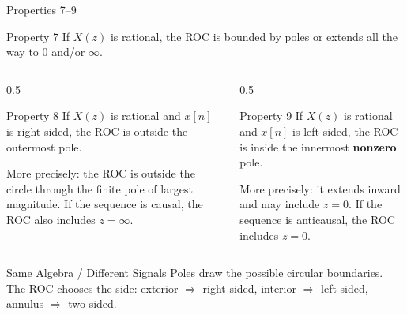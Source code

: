 \begin{frame}[t]{Properties 7--9}
  \footnotesize
  \begin{conceptbox}{Property 7}
    If $X(z)$ is rational, the ROC is bounded by poles or extends all the way to $0$ and/or $\infty$.
  \end{conceptbox}

  \begin{columns}[T]
    \begin{column}{0.5\textwidth}
      \begin{conceptbox}{Property 8}
        If $X(z)$ is rational and $x[n]$ is right-sided, the ROC is outside the outermost pole.
      \end{conceptbox}
      More precisely: the ROC is outside the circle through the finite pole of largest magnitude.
      If the sequence is causal, the ROC also includes $z=\infty$.
    \end{column}
    \begin{column}{0.5\textwidth}
      \begin{conceptbox}{Property 9}
        If $X(z)$ is rational and $x[n]$ is left-sided, the ROC is inside the innermost \textbf{nonzero} pole.
      \end{conceptbox}
      More precisely: it extends inward and may include $z=0$.
      If the sequence is anticausal, the ROC includes $z=0$.
    \end{column}
  \end{columns}

  \vspace{0.08cm}
  \begin{insightbox}{Same Algebra / Different Signals}
    Poles draw the possible circular boundaries. The ROC chooses the side:
    exterior $\Rightarrow$ right-sided, interior $\Rightarrow$ left-sided, annulus $\Rightarrow$ two-sided.
  \end{insightbox}
\end{frame}

